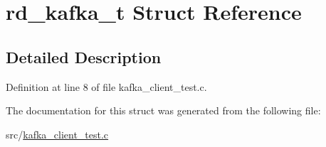\hypertarget{structrd__kafka__t}{\section{rd\-\_\-kafka\-\_\-t \-Struct \-Reference}
\label{structrd__kafka__t}
}


\subsection{\-Detailed \-Description}


\-Definition at line 8 of file kafka\-\_\-client\-\_\-test.\-c.



\-The documentation for this struct was generated from the following file\-:\begin{DoxyCompactItemize}
\item 
src/\hyperlink{kafka__client__test_8c}{kafka\-\_\-client\-\_\-test.\-c}\end{DoxyCompactItemize}
